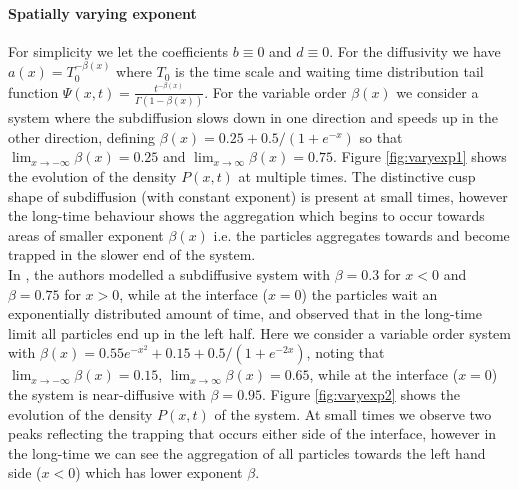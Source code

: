 \documentclass[a4paper,12pt]{elsarticle}
\numberwithin{equation}{section}
\theoremstyle{plain}
\theoremstyle{definition}
\theoremstyle{remark}
\numberwithin{equation}{section}
\newcommand{\1}{\mathbf 1}
\begin{document}
\paragraph{Spatially varying exponent}  For simplicity we let the coefficients $b \equiv 0$ and $d \equiv 0$. For the diffusivity we have $a(x) = T_0^{-\beta(x)}$ where $T_0$ is the time scale and waiting time distribution tail function $\Psi(x,t) = \frac{t^{-\beta(x)}}{\Gamma (1-\beta(x))}$. For the variable order $\beta(x)$ we consider a system where the subdiffusion slows down in one direction and speeds up in the other direction, defining $\beta(x) = 0.25 + 0.5/(1+e^{-x})$ so that $\lim_{x\to -\infty} \beta (x) = 0.25$ and $\lim_{x\to \infty} \beta (x) = 0.75$. Figure \ref{fig:varyexp1} shows the evolution of the density $P(x,t)$ at multiple times. The distinctive cusp shape of subdiffusion (with constant exponent) is present at small times, however the long-time behaviour shows the aggregation which begins to occur towards areas of smaller exponent $\beta(x)$ i.e. the particles aggregates towards and become trapped in the slower end of the system. \\

In \cite{Korabel2010}, the authors modelled a subdiffusive system with $\beta = 0.3$ for $x<0$ and $\beta = 0.75$ for $x>0$, while at the interface ($x=0$) the particles wait an exponentially distributed amount of time, and observed that in the long-time limit all particles end up in the left half. Here we consider a variable order system with $\beta (x) = 0.55e^{-x^2} + 0.15 + 0.5/(1+e^{-2x})$, noting that $\lim_{x\to -\infty} \beta (x) = 0.15$, $\lim_{x\to \infty} \beta (x) = 0.65$, while at the interface ($x=0$) the system is near-diffusive with $\beta = 0.95$. Figure \ref{fig:varyexp2} shows the evolution of the density $P(x,t)$ of the system. At small times we observe two peaks reflecting the trapping that occurs either side of the interface, however in the long-time we can see the aggregation of all particles towards the left hand side ($x<0$) which has lower exponent $\beta$. \\
\end{document}
